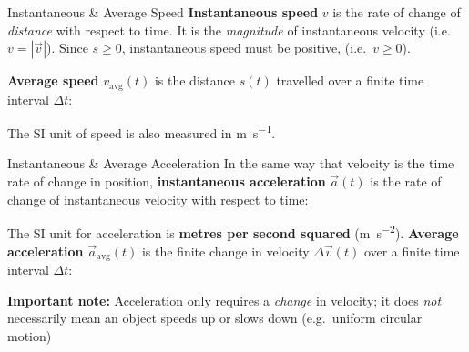 \documentclass[12pt,compress,aspectratio=169,dvipsnames]{beamer}
\begin{document}
\begin{frame}{Instantaneous \& Average Speed}
  \textbf{Instantaneous speed} $v$ is the rate of change of \emph{distance}
  with respect to time. It is the \emph{magnitude} of instantaneous velocity
  (i.e.\ $v=|\vec v|$). Since $s\geq 0$, instantaneous speed must be positive,
  (i.e.\ $v\geq 0$).


  \textbf{Average speed} $v_\text{avg}(t)$ is the distance $s(t)$ travelled over
  a finite time interval $\Delta t$:
  

  The SI unit of speed is also measured in \si{\metre\per\second}.
\end{frame}





\begin{frame}{Instantaneous \& Average Acceleration}
  In the same way that velocity is the time rate of change in position,
  \textbf{instantaneous acceleration} $\vec a(t)$ is the rate of change of
  instantaneous velocity with respect to time:


  The SI unit for acceleration is \textbf{metres per second squared}
  (\si{\metre\per\second\squared}). \textbf{Average acceleration}
  $\vec a_\text{avg}(t)$ is the finite change in velocity $\Delta\vec v(t)$ over
  a finite time interval $\Delta t$:


  \textbf{Important note:} Acceleration only requires a \emph{change} in
  velocity; it does \emph{not} necessarily mean an object speeds up or slows
  down (e.g.\ uniform circular motion)
\end{frame}
\end{document}

